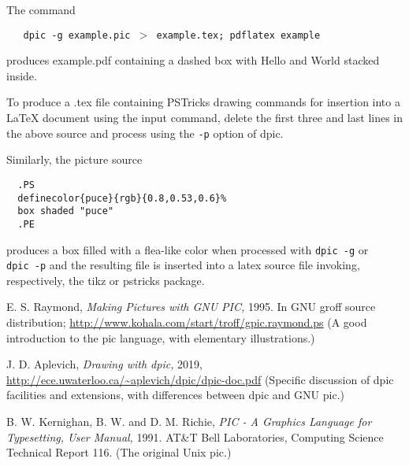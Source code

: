 The command


{\tt \ \ \ dpic\ -g\ example.pic\ $>$\ example.tex;\ pdflatex\ example}

produces example.pdf containing a dashed box with Hello and World
stacked inside.

To produce a .tex file containing PSTricks drawing commands for
insertion into a LaTeX document using the {\tt {}}input command,
delete the first three and last lines in the above source
and process using the
{\tt -p}
option of
dpic.

Similarly, the picture source

{\tt \ \ .PS}
\\\hbox{}\hskip-1pt
{\tt \ \ {\tt {}}definecolor\{puce\}\{rgb\}\{0.8,0.53,0.6\}\%}
\\\hbox{}\hskip-1pt
{\tt \ \ box\ shaded\ {\tt "}puce{\tt "}}
\\\hbox{}\hskip-1pt
{\tt \ \ .PE}

produces a box filled with a flea-like color when processed with
{\tt dpic\ -g}
or
{\tt dpic\ -p}
and the resulting file is inserted into a latex source file invoking,
respectively, the tikz or pstricks package.

E. S. Raymond,
{\it Making Pictures with GNU PIC,}
1995.
In GNU groff source distribution;
\url{http://www.kohala.com/start/troff/gpic.raymond.ps}
(A good introduction to the pic language, with elementary
illustrations.)

J. D. Aplevich,
{\it Drawing with dpic,}
2019,
\url{http://ece.uwaterloo.ca/~aplevich/dpic/dpic-doc.pdf}
(Specific discussion of dpic
facilities and extensions, with differences between dpic and GNU pic.)

B. W. Kernighan, B. W. and D. M. Richie,
{\it PIC - A Graphics Language for Typesetting, User Manual,}
1991.
AT\&T Bell Laboratories,
Computing Science Technical Report
116.
(The original Unix
pic.)

